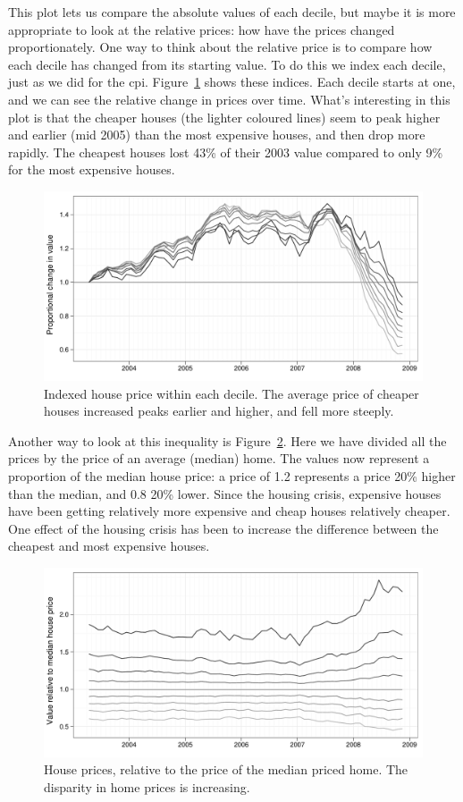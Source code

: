 \documentclass[oneside]{article}
\begin{document}
This plot lets us compare the absolute values of each decile, but maybe it is more appropriate to look at the relative prices: how have the prices changed proportionately.  One way to think about the relative price is to compare how each decile has changed from its starting value.  To do this we index each decile, just as we did for the {\sc cpi}. Figure~\ref{fig:decile-ind} shows these indices.  Each decile starts at one, and we can see the relative change in prices over time.  What's interesting in this plot is that the cheaper houses (the lighter coloured lines) seem to peak higher and earlier (mid 2005) than the most expensive houses, and then drop more rapidly.  The cheapest houses lost 43\% of their 2003 value compared to only 9\% for the most expensive houses.

\begin{figure}[htbp]
  \centering
  \includegraphics[width=0.75\linewidth]{decile-ind}
  \caption{Indexed house price within each decile.  The average price of cheaper houses increased peaks earlier and higher, and fell more steeply.}
  \label{fig:decile-ind}
\end{figure}

Another way to look at this inequality is Figure~\ref{fig:decile-rel}.  Here we have divided all the prices by the price of an average (median) home.  The values now represent a proportion of the median house price: a price of 1.2 represents a price 20\% higher than the median, and 0.8 20\% lower. Since the housing crisis, expensive houses have been getting relatively more expensive and cheap houses relatively cheaper.  One effect of the housing crisis has been to increase the difference between the cheapest and most expensive houses.

\begin{figure}[htbp]
  \centering
  \includegraphics[width=0.75\linewidth]{decile-rel}
  \caption{House prices, relative to the price of the median priced home.  The disparity in home prices is increasing.}
  \label{fig:decile-rel}
\end{figure}
\end{document}
